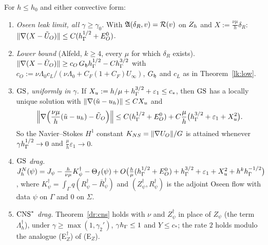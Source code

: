 \begin{theorem}\label{ns:oseen}
For $h\le h_0$ and either convective form:
\begin{enumerate}[label=(\roman*)]
\item \emph{Oseen leak limit, all $\gamma\ge\gamma_0$.} With $\mathfrak A(\delta_R,v)=\mathcal R(v)$ on $Z_h$ and $X:=\frac{\nu\mu}h\delta_R$: $\lVert \nabla(X-\tilde U_O)\rVert\le C(h_\Gamma^{1/2}+E^0_O)$.
\item \emph{Lower bound} (Alfeld, $k\ge4$, every $\mu$ for which $\delta_R$ exists). $\lVert \nabla(X-\tilde U_O)\rVert\ge c_O\,G_\mathfrak hh_\Gamma^{1/2}-Ch_\Gamma^{3/2}$ with $c_O:=\nu\Lambda_0c_L/(\nu\Lambda_0+C_F(1+C_F)U_\infty)$, $G_\mathfrak h$ and $c_L$ as in Theorem~\ref{lk:low}.
\item \emph{$\mathrm{GS}$, uniformly in $\gamma$.} If $X_u:=h/\mu+h_\Gamma^{3/2}+\varepsilon_1\le c_\ast$, then $\mathrm{GS}$ has a locally unique solution with $\lVert \nabla(\tilde u-u_h)\rVert\le CX_u$ and
\[
\Bigl\|\nabla\Bigl(\frac{\nu\mu}h(\tilde u-u_h)-\tilde U_O\Bigr)\Bigr\|\le C(h_\Gamma^{1/2}+E^0_O)+C\frac\mu h\bigl(h_\Gamma^{3/2}+\varepsilon_1+X_u^2\bigr).
\]
So the Navier--Stokes $H^1$ constant $K_{NS}=\lVert \nabla U_O\rVert/G$ is attained whenever $\gamma h_\Gamma^{1/2}\to0$ and $\frac\mu h\varepsilon_1\to0$.
\item \emph{$\mathrm{GS}$ drag.} $J^N_h(\psi)=J_\psi-\frac h{\nu\mu}K^\dagger_\psi-\Theta_f(\psi)+O\bigl(\frac h\mu(h_\Gamma^{1/2}+E^0_O)+h_\Gamma^{3/2}+\varepsilon_1+X_u^2+h^kh_\Gamma^{-1/2}\bigr)$, where $K^\dagger_\psi=\int_\Gamma q(R^\dagger_\psi-\bar R^\dagger_\psi)$ and $(Z^\dagger_\psi,R^\dagger_\psi)$ is the adjoint Oseen flow with data $\psi$ on $\Gamma$ and $0$ on $\Sigma$.
\item \emph{$\mathrm{CNS}^\ast$ drag.} Theorem~\ref{dr:cns} holds with $\nu$ and $Z^\dagger_\psi$ in place of $Z_\psi$ (the term $\Lambda^\dagger_h$), under $\gamma\ge\max(1,\gamma_2')$, $\gamma h_\Gamma\le1$ and $Y\le c_\ast$; the rate $2$ holds modulo the analogue (E$_Z^\dagger$) of (E$_Z$).
\end{enumerate}
\end{theorem}
